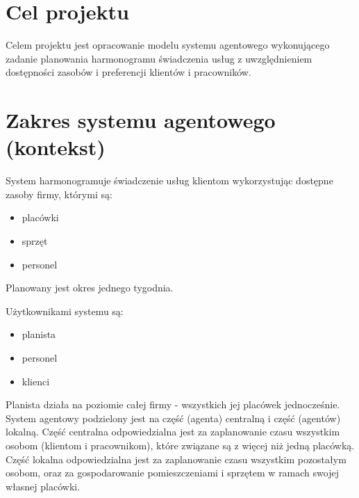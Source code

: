 \documentclass[oneside]{article}
\begin{document}

\section{Cel projektu}
Celem projektu jest opracowanie modelu systemu agentowego
wykonującego zadanie planowania harmonogramu świadczenia usług
z uwzględnieniem dostępności zasobów i preferencji klientów i pracowników.

\section{Zakres systemu agentowego (kontekst)} \label{Zakres}
System harmonogramuje świadczenie usług klientom wykorzystując dostępne zasoby firmy, którymi są:
\begin{itemize}
	\item{placówki}
	\item{sprzęt}
	\item{personel}
\end{itemize}
Planowany jest okres jednego tygodnia.

Użytkownikami systemu są:
\begin{itemize}
	\item{planista}
	\item{personel}
	\item{klienci}
\end{itemize}
Planista działa na poziomie całej firmy - wszystkich jej placówek jednocześnie.
System agentowy podzielony jest na część (agenta) centralną i część (agentów)
lokalną. Część centralna odpowiedzialna jest za zaplanowanie czasu wszystkim
osobom (klientom i pracownikom), które związane są z więcej niż jedną placówką.
Część lokalna odpowiedzialna jest za zaplanowanie czasu wszystkim pozostałym
osobom, oraz za gospodarowanie pomieszczeniami i sprzętem w ramach swojej
własnej placówki.








\end{document}
